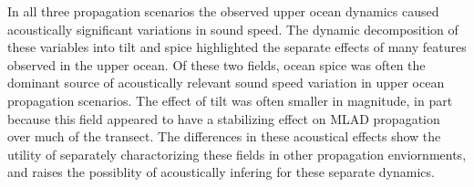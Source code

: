 \documentclass[preprint,NumberedRefs]{JASA}
\begin{document}
In all three propagation scenarios the observed upper ocean dynamics caused acoustically significant variations in sound speed. The dynamic decomposition of these variables into tilt and spice highlighted the separate effects of many features observed in the upper ocean. Of these two fields, ocean spice was often the dominant source of acoustically relevant sound speed variation in upper ocean propagation scenarios. The effect of tilt was often smaller in magnitude, in part because this field appeared to have a stabilizing effect on MLAD propagation over much of the transect. The differences in these acoustical effects show the utility of separately charactorizing these fields in other propagation enviornments, and raises the possiblity of acoustically infering for these separate dynamics.



\end{document}
